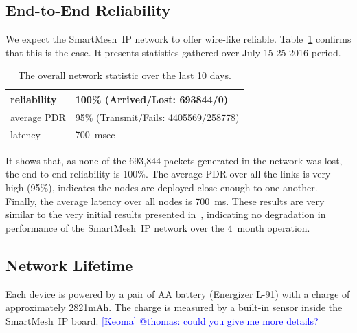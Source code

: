 \documentclass{sig-alternate}
\newcommand{\keoma}[1]       {\textcolor{blue}{[Keoma] #1}}
\newcommand{\smip}                {SmartMesh~IP\xspace}
\begin{document}
\subsection{End-to-End Reliability}
\label{sec:net_reliability}


We expect the \smip network to offer wire-like reliable.
Table~\ref{tab:net_stats} confirms that this is the case.
It presents statistics gathered over July 15-25 2016 period.

\begin{table}
    \begin{tabular}{|l|l|}
        \hline
        reliability & 100\% (Arrived/Lost:   693844/0)\\ \hline
        average PDR & 95\% (Transmit/Fails: 4405569/258778)\\ \hline
        latency     & 700~msec\\
        \hline
    \end{tabular}
    \caption{The overall network statistic over the last 10 days.}
    \label{tab:net_stats}
\end{table}

It shows that, as none of the 693,844 packets generated in the network was lost, the end-to-end reliability is 100\%.
The average PDR over all the links is very high (95\%), indicates the nodes are deployed close enough to one another.
Finally, the average latency over all nodes is 700~ms.
These results are very similar to the very initial results presented in~\cite{watteyne16peach}, indicating no degradation in performance of the \smip network over the 4~month operation.

\subsection{Network Lifetime}
\label{sec:lifetime}


Each device is powered by a pair of AA battery (Energizer L-91) with a charge of approximately 2821mAh.
The charge is measured by a built-in sensor inside the \smip board. \keoma{@thomas: could you give me more details?}

\end{document}

